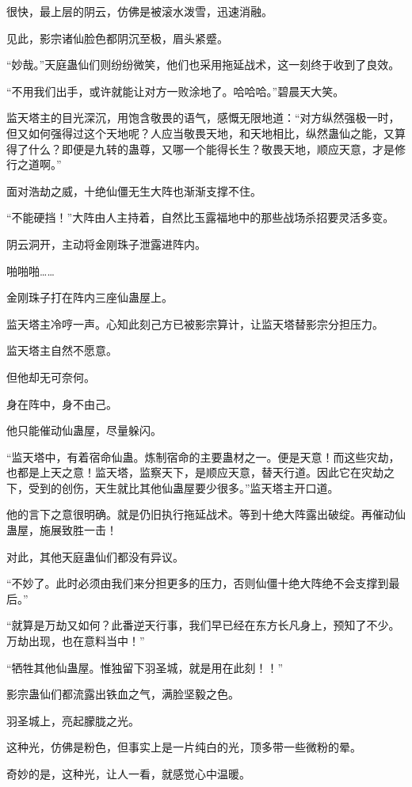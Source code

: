 \begin{this_body}
很快，最上层的阴云，仿佛是被滚水泼雪，迅速消融。

见此，影宗诸仙脸色都阴沉至极，眉头紧蹙。

“妙哉。”天庭蛊仙们则纷纷微笑，他们也采用拖延战术，这一刻终于收到了良效。

“不用我们出手，或许就能让对方一败涂地了。哈哈哈。”碧晨天大笑。

监天塔主的目光深沉，用饱含敬畏的语气，感慨无限地道：“对方纵然强极一时，但又如何强得过这个天地呢？人应当敬畏天地，和天地相比，纵然蛊仙之能，又算得了什么？即便是九转的蛊尊，又哪一个能得长生？敬畏天地，顺应天意，才是修行之道啊。”

面对浩劫之威，十绝仙僵无生大阵也渐渐支撑不住。

“不能硬挡！”大阵由人主持着，自然比玉露福地中的那些战场杀招要灵活多变。

阴云洞开，主动将金刚珠子泄露进阵内。

啪啪啪……

金刚珠子打在阵内三座仙蛊屋上。

监天塔主冷哼一声。心知此刻己方已被影宗算计，让监天塔替影宗分担压力。

监天塔主自然不愿意。

但他却无可奈何。

身在阵中，身不由己。

他只能催动仙蛊屋，尽量躲闪。

“监天塔中，有着宿命仙蛊。炼制宿命的主要蛊材之一。便是天意！而这些灾劫，也都是上天之意！监天塔，监察天下，是顺应天意，替天行道。因此它在灾劫之下，受到的创伤，天生就比其他仙蛊屋要少很多。”监天塔主开口道。

他的言下之意很明确。就是仍旧执行拖延战术。等到十绝大阵露出破绽。再催动仙蛊屋，施展致胜一击！

对此，其他天庭蛊仙们都没有异议。

“不妙了。此时必须由我们来分担更多的压力，否则仙僵十绝大阵绝不会支撑到最后。”

“就算是万劫又如何？此番逆天行事，我们早已经在东方长凡身上，预知了不少。万劫出现，也在意料当中！”

“牺牲其他仙蛊屋。惟独留下羽圣城，就是用在此刻！！”

影宗蛊仙们都流露出铁血之气，满脸坚毅之色。

羽圣城上，亮起朦胧之光。

这种光，仿佛是粉色，但事实上是一片纯白的光，顶多带一些微粉的晕。

奇妙的是，这种光，让人一看，就感觉心中温暖。


\end{this_body}
